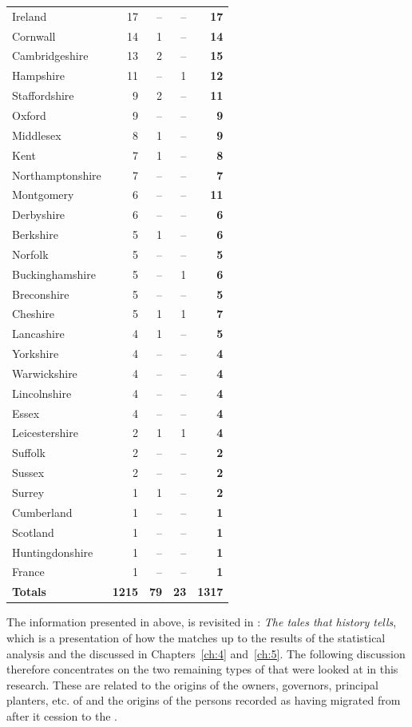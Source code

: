 \begin{longtable}{lrrrr}
Ireland & 17 & -- & -- & \textbf{17}\\
Cornwall & 14 & 1 & -- & \textbf{14}\\
Cambridgeshire & 13 & 2 & -- & \textbf{15}\\
Hampshire & 11 & -- & 1 &\textbf{12}\\
Staffordshire & 9 & 2 & -- & \textbf{11}\\
Oxford & 9 & -- & -- & \textbf{9}\\
Middlesex & 8 & 1 & -- & \textbf{9}\\
Kent & 7 & 1 & -- & \textbf{8}\\
Northamptonshire & 7 & -- & -- & \textbf{7}\\
Montgomery & 6 & -- & -- & \textbf{11}\\
Derbyshire & 6 & -- & -- & \textbf{6}\\
Berkshire & 5 & 1 & -- & \textbf{6}\\
Norfolk & 5 & -- & -- & \textbf{5}\\
Buckinghamshire & 5 & -- & 1 & \textbf{6}\\
Breconshire & 5 & -- & -- & \textbf{5}\\
Cheshire & 5 & 1 & 1 & \textbf{7}\\
Lancashire & 4 & 1 & -- & \textbf{5}\\
Yorkshire & 4 & -- & -- & \textbf{4}\\
Warwickshire & 4 & -- & -- & \textbf{4}\\
Lincolnshire & 4 & -- & -- & \textbf{4}\\
Essex & 4 & -- & -- & \textbf{4}\\
Leicestershire & 2 & 1 & 1 & \textbf{4}\\
Suffolk & 2 & -- & -- & \textbf{2}\\
Sussex & 2 & -- & -- & \textbf{2}\\
Surrey &1 & 1 & -- & \textbf{2}\\
Cumberland & 1 & -- & -- & \textbf{1}\\
Scotland & 1 & -- & -- & \textbf{1}\\
Huntingdonshire & 1 & -- & -- & \textbf{1}\\
France & 1 & -- & -- & \textbf{1}\\
\textbf{Totals} & \textbf{1215} & \textbf{79} & \textbf{23} & \textbf{1317}
\label{Table 6.3}
\end{longtable}

The information presented in  above, is revisited in : \emph{The tales that history tells}, which is a presentation of how the  matches up to the results of the statistical analysis and the  discussed in Chapters~\ref{ch:4} and~\ref{ch:5}. The following discussion therefore concentrates on the two remaining types of  that were looked at in this research. These are related to the origins of the owners, governors, principal planters, etc. of  and the origins of the persons recorded as having migrated from  after it cession to the .

